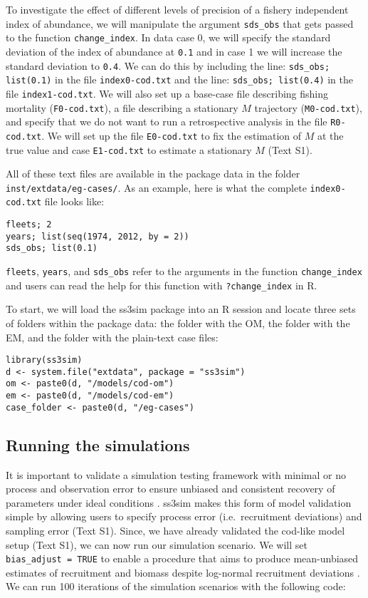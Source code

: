 \documentclass[10pt]{article}
\begin{document}
To investigate the effect of different levels of precision of a fishery independent index of abundance, we will manipulate the argument \texttt{sds\_obs} that gets passed to the function \texttt{change\_index}. In data case 0, we will specify the standard deviation of the index of abundance at \texttt{0.1} and in case 1 we will increase the standard deviation to \texttt{0.4}. We can do this by including the line: \texttt{sds\_obs; list(0.1)} in the file \texttt{index0-cod.txt} and the line: \texttt{sds\_obs; list(0.4)} in the file \texttt{index1-cod.txt}. We will also set up a base-case file describing fishing mortality (\texttt{F0-cod.txt}), a file describing a stationary $M$ trajectory (\texttt{M0-cod.txt}), and specify that we do not want to run a retrospective analysis in the file \texttt{R0-cod.txt}. We will set up the file \texttt{E0-cod.txt} to fix the estimation of $M$ at the true value and case \texttt{E1-cod.txt} to estimate a stationary $M$ (Text S1).

All of these text files are available in the package data in the folder \texttt{inst/extdata/eg-cases/}. As an example, here is what the complete \texttt{index0-cod.txt} file looks like:

\begin{verbatim}
fleets; 2
years; list(seq(1974, 2012, by = 2))
sds_obs; list(0.1)
\end{verbatim}

\noindent
\texttt{fleets}, \texttt{years}, and \texttt{sds\_obs} refer to the arguments in the function \texttt{change\_index} and users can read the help for this function with \texttt{?change\_index} in R.

To start, we will load the ss3sim package into an R session and locate three sets of folders within the package data: the folder with the OM, the folder with the EM, and the folder with the plain-text case files:

\begin{verbatim}
library(ss3sim)
d <- system.file("extdata", package = "ss3sim")
om <- paste0(d, "/models/cod-om")
em <- paste0(d, "/models/cod-em")
case_folder <- paste0(d, "/eg-cases")
\end{verbatim}

\subsection*{Running the simulations}

It is important to validate a simulation testing framework with minimal or no process and observation error to ensure unbiased and consistent recovery of parameters under ideal conditions \cite{hilborn1992, rykiel1996}. ss3sim makes this form of model validation simple by allowing users to specify process error (i.e.~recruitment deviations) and sampling error (Text S1). Since, we have already validated the cod-like model setup (Text S1), we can now run our simulation scenario. We will set \texttt{bias\_adjust = TRUE} to enable a procedure that aims to produce mean-unbiased estimates of recruitment and biomass despite log-normal recruitment deviations \cite{methot2011}. We can run 100 iterations of the simulation scenarios with the following code:
\end{document}
